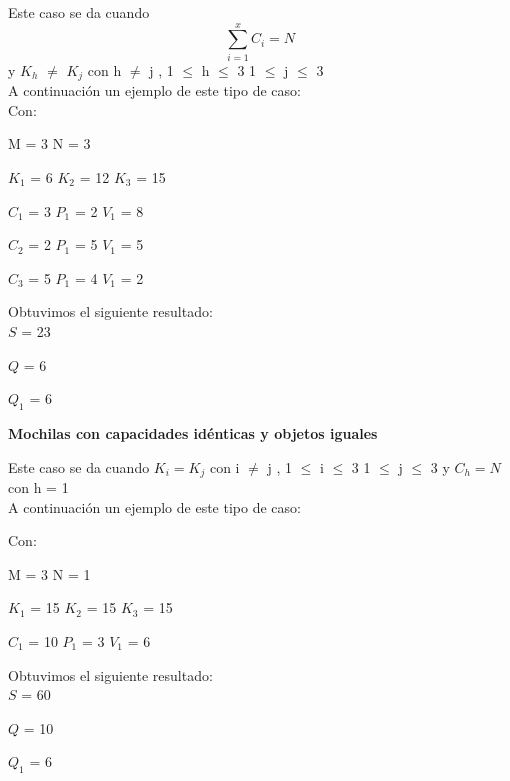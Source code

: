 Este caso se da cuando \[
\sum_{i=1}^{x}C_{i}=N 
\]  y $K_{h}$ $\neq$ $K_{j}$ con h $\neq$ j , 1 $\leq$ h $\leq$ 3  1 $\leq$ j $\leq$ 3 \\

A continuaci\'on un ejemplo de este tipo de caso:\\

 Con:
 
 M = 3 N = 3
 
 $K_{1}$ = 6  $K_{2}$ = 12  $K_{3}$ = 15
 
 $C_{1}$ = 3 $P_{1}$ = 2 $V_{1}$ = 8
 
 $C_{2}$ = 2 $P_{1}$ = 5 $V_{1}$ = 5
 
 $C_{3}$ = 5 $P_{1}$ = 4 $V_{1}$ = 2
  
  \indent  
  
  Obtuvimos el siguiente resultado:\\

$S$ = 23

$Q$ = 6

$Q_{1}$ = 6

\begin{center}
 \textbf{Mochilas con capacidades id\'enticas y objetos iguales}
\end{center}

Este caso se da cuando $K_{i} = K_{j}$ con i $\neq$ j , 1 $\leq$ i $\leq$ 3  1 $\leq$ j $\leq$ 3  y $C_{h} = N$ con h = 1\\

A continuaci\'on un ejemplo de este tipo de caso:

 Con:
 
 M = 3 N = 1
 
 $K_{1}$ = 15  $K_{2}$ = 15  $K_{3}$ = 15
 
 $C_{1}$ = 10 $P_{1}$ = 3 $V_{1}$ = 6
 
  \indent  
  
  Obtuvimos el siguiente resultado:\\

$S$ = 60

$Q$ = 10

$Q_{1}$ = 6